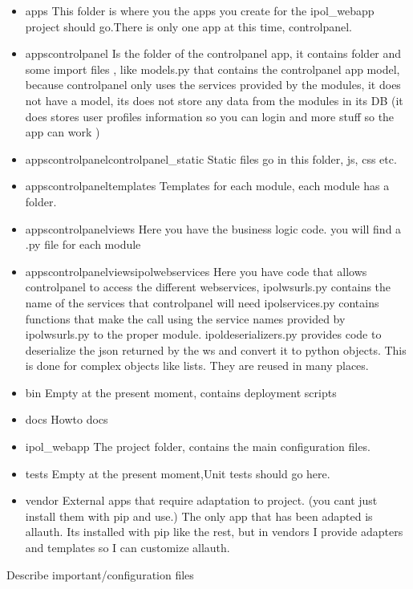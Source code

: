 \begin{itemize}
\item  apps
This folder is where you the apps you create for the ipol\_webapp project should go.There is only one app at this time, controlpanel.
\item  apps\/controlpanel
Is the folder of the controlpanel app, it contains folder and some import files , like models.py that contains the controlpanel app model, because controlpanel only uses the services provided by the modules, it does not have a model, its does not store any data from the modules in its DB (it does stores user profiles information so you can login and more stuff so the app can work )
\item  apps\/controlpanel\/controlpanel\_static
Static files go in this folder, js, css etc.
\item  apps\/controlpanel\/templates
Templates for each module, each module has a folder.
\item  apps\/controlpanel\/views
Here you have the business logic code. you will find a .py file for each module
\item  apps\/controlpanel\/views\/ipolwebservices
Here you have code that allows controlpanel to access the different webservices, 
ipolwsurls.py contains the name of the services that controlpanel will need
ipolservices.py contains functions that make the call using the service names provided by ipolwsurls.py to the proper module.
ipoldeserializers.py provides code to deserialize the json returned by the ws and convert it to python objects. This is done for complex objects like lists. They are reused in many places. 
\item  bin
Empty at the present moment, contains deployment scripts
\item  docs
Howto docs
\item  ipol\_webapp
The project folder, contains the main configuration files.
\item  tests
Empty at the present moment,Unit tests should go here.
\item  vendor
External apps that require adaptation to project. (you cant just install them with pip and use.)
The only app that has been adapted is allauth. Its installed with pip like the rest, but in vendors I provide adapters and templates so I can customize allauth.
\end{itemize}

Describe important/configuration files

